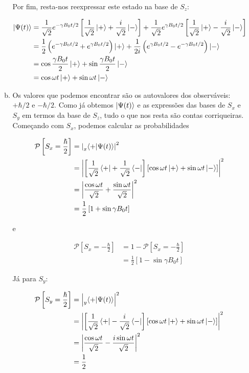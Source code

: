 \documentclass[a4paper, 12pt, notitlepage]{article}
\begin{document}
\begin{enumerate}
\begin{enumerate}[(a)]
Por fim, resta-nos reexpressar este estado na base de $S_z$:

\begin{align*}
  \ket{\Psi(t)} &= \frac{1}{\sqrt{2}} e^{-\gamma B_0 t/2} \left[ \frac{1}{\sqrt{2}} \ket{+} + \frac{i}{\sqrt{2}} \ket{-}\right] + \frac{1}{\sqrt{2}} e^{\gamma B_0 t/2} \left[ \frac{1}{\sqrt{2}} \ket{+} - \frac{i}{\sqrt{2}} \ket{-}\right] \\
  &= \frac{1}{2} \left(e^{-\gamma B_0 t/2} + e^{\gamma B_0 t/2}\right) \ket{+} + \frac{1}{2i}\left(e^{\gamma B_0 t/2} - e^{-\gamma B_0 t/2}\right) \ket{-} \\
  &= \cos \frac{\gamma B_0 t}{2} \ket{+} + \sin \frac{\gamma B_0 t}{2} \ket{-} \\
  &= \cos \omega t \ket{+} + \sin \omega t \ket{-}
\end{align*}

\item Os valores que podemos encontrar são os autovalores dos observáveis: $+ \hbar/2$ e $- \hbar/2$. Como já obtemos $\ket{\Psi(t)}$ e as expressões das bases de $S_x$ e $S_y$ em termos da base de $S_z$, tudo o que nos resta são contas corriqueiras. Começando com $S_x$, podemos calcular as probabilidades

\begin{align*}
  \mathcal{P}\left[ S_x = \frac{\hslash}{2}\right] &= \left| \prescript{}{x}{\left\langle +|\Psi(t)\right\rangle} \right|^2 \\
  &= \left| \left[\frac{1}{\sqrt{2}} \bra{+} + \frac{1}{\sqrt{2}}\bra{-}\right] \left[\cos \omega t \ket{+} + \sin \omega t \ket{-} \right] \right |^2 \\
  &= \left|\frac{\cos \omega t}{\sqrt{2}}  + \frac{\sin\omega t}{\sqrt{2}}\right|^2 \\
  &= \frac{1}{2}\left[ 1 + \sin \gamma B_0 t\right]
\end{align*}

\noindent e

\begin{align*}
  \mathcal{P}\left[S_x = -\frac{\hbar}{2}\right] &= 1 - \mathcal{P}\left[S_x = -\frac{\hbar}{2}\right] \\
  &= \frac{1}{2}\left[1 - \sin \gamma B_0 t \right]
\end{align*}

Já para $S_y$:

\begin{align*}
  \mathcal{P}\left[ S_y = \frac{\hslash}{2}\right] &= \left| \prescript{}{y}{\left\langle + | \Psi(t) \right\rangle} \right|^2 \\
  &= \left| \left[\frac{1}{\sqrt{2}} \bra{+} - \frac{i}{\sqrt{2}}\bra{-}\right] \left[\cos \omega t \ket{+} + \sin \omega t \ket{-} \right] \right |^2 \\
  &= \left|\frac{\cos \omega t}{\sqrt{2}} - \frac{i\sin\omega t}{\sqrt{2}}\right|^2 \\
  &= \frac{1}{2}
\end{align*}


\end{enumerate}
\end{enumerate}
\end{document}
